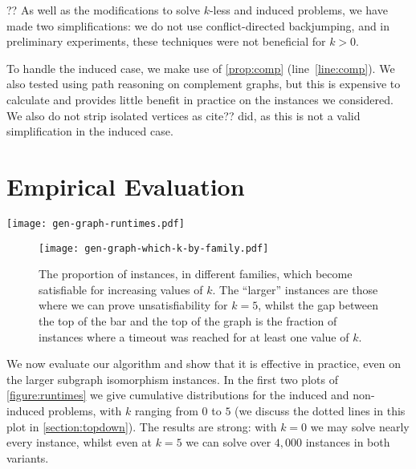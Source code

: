 \documentclass[letterpaper]{article}
\theoremstyle{definition}
\begin{document}
?? As well as the modifications to solve $k$-less and induced problems, we have made two
simplifications: we do not use conflict-directed backjumping, and in preliminary experiments, these
techniques were not beneficial for $k > 0$.

To handle the induced case, we make use of \cref{prop:comp} (line~\ref{line:comp}). We also tested
using path reasoning on complement graphs, but this is expensive to calculate and provides little
benefit in practice on the instances we considered.  We also do not strip isolated vertices as
cite?? did, as this is not a valid simplification in the induced case.

\section{Empirical Evaluation}\label{section:evaluation}

\begin{figure*}[tb]
    \centering
    \texttt{[image: gen-graph-runtimes.pdf]}
    \caption{In the first two plots we show the cumulative number of instances solved over time, for the
        induced and non-induced problems, with different values of $k$. We also show the results of
        iteratively increasing $k$ until a solution is found, and in the induced case, the
        performance of two leading maximum common subgraph algorithms. In the third plot we show results
        comparing iteratively increasing $k$ with our algorithm to other approaches on maximum
        common induced subgraph instances.}\label{figure:runtimes}
\end{figure*}

\begin{figure}[h!]
    \centering
    \texttt{[image: gen-graph-which-k-by-family.pdf]}
    \caption{The proportion of instances, in different families, which become satisfiable for
    increasing values of $k$. The ``larger'' instances are those where we can prove unsatisfiability for
    $k = 5$, whilst the gap between the top of the bar and the top of the graph is the fraction of
    instances where a timeout was reached for at least one value of $k$.}\label{figure:which-k}
\end{figure}

We now evaluate our algorithm and show that it is effective in practice, even on the larger subgraph
isomorphism instances. In the first two plots of \cref{figure:runtimes} we give cumulative
distributions for the induced and non-induced problems, with $k$ ranging from $0$ to $5$ (we discuss
the dotted lines in this plot in \cref{section:topdown}). The results are strong: with $k = 0$ we
may solve nearly every instance, whilst even at $k = 5$ we can solve over $4,000$ instances in both
variants.
\end{document}
